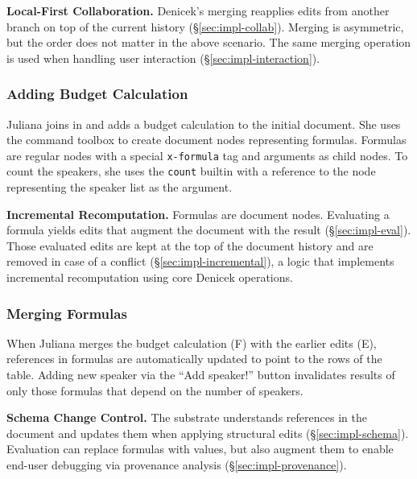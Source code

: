 \documentclass[sigconf]{acmart}
\newcommand{\diff}[1]{{#1}}
\newcommand{\note}[1]{}
\newcommand*\circled[1]{\textnormal{\footnotesize\sffamily\bfseries\protect\tikz[baseline=(char.base)]{
  \node[shape=circle,fill=black,text=white,draw,inner sep=1pt] (char) {#1};}}}
\DeclareRobustCommand{\keyideabox}[3]
{\vspace{\dimexpr\baselineskip\relax} \noindent\colorbox{gray!20}{
\parbox{\dimexpr\columnwidth-\marginparsep+1pt\relax}
{\small {#1} \textbf{#2.} #3}
}}
\begin{document}
\keyideabox{\faLightbulbO}{Local-First Collaboration}{Denicek's merging
reapplies edits from another branch on top of the current history (\S\ref{sec:impl-collab}).
Merging is asymmetric, but the order does not matter in the above scenario. The same merging
operation is used when handling user interaction (\S\ref{sec:impl-interaction}).}

\subsubsection*{\circled{F} Adding Budget Calculation} Juliana joins in and adds a budget calculation to
the initial document. \diff{She uses the command toolbox to create document nodes representing
formulas. Formulas are regular nodes with a special} {\small\Verb_x-formula_} \diff{tag and
arguments as child nodes. To count the speakers, she uses the} {\small\Verb_count_} \diff{builtin
with a reference to the node representing the speaker list as the argument.}\note{Modified to describe
representation of formulas.}

\keyideabox{\faLightbulbO}{Incremental Recomputation}{Formulas are document nodes.
Evaluating a formula yields edits that augment the document with the result
(\S\ref{sec:impl-eval}). Those evaluated edits are kept at the top of the document history and are
removed in case of a conflict (\S\ref{sec:impl-incremental}), a logic that implements
incremental recomputation using core Denicek operations.}

\subsubsection*{\circled{G} Merging Formulas} When Juliana merges the budget calculation (F) with
the earlier edits (E), references in formulas are automatically updated to point to the \diff{rows of the table}.
Adding new speaker via the ``Add speaker!'' button \diff{invalidates results of only those formulas
that depend on the number of speakers.}

\keyideabox{\faLightbulbO}{Schema Change Control}{The substrate understands references in
the document and updates them when applying structural edits (\S\ref{sec:impl-schema}).
Evaluation can replace formulas with values, but also augment them to enable
end-user debugging via provenance analysis (\S\ref{sec:impl-provenance}).}

\end{document}
